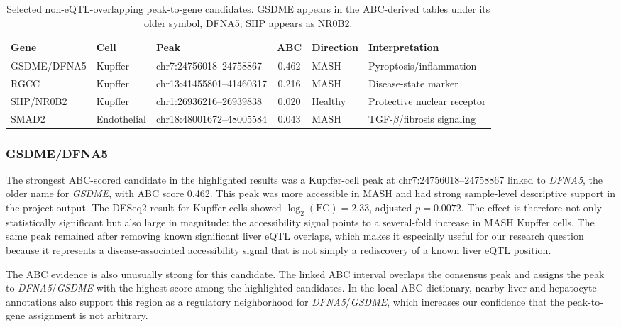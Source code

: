 \documentclass[11pt]{article}
\begin{document}
  \begin{table}[H]
    \centering
    \scriptsize
    \begin{tabularx}{\linewidth}{l l X c l X}
      \toprule
      Gene & Cell & Peak & ABC & Direction & Interpretation \\
      \midrule
      GSDME/DFNA5 & Kupffer & chr7:24756018--24758867 & 0.462 & MASH & Pyroptosis/inflammation \\
      RGCC & Kupffer & chr13:41455801--41460317 & 0.216 & MASH & Disease-state marker \\
      SHP/NR0B2 & Kupffer & chr1:26936216--26939838 & 0.020 & Healthy & Protective nuclear receptor \\
      SMAD2 & Endothelial & chr18:48001672--48005584 & 0.043 & MASH & TGF-\(\beta\)/fibrosis signaling \\
      \bottomrule
    \end{tabularx}
    \caption{Selected non-eQTL-overlapping peak-to-gene candidates. GSDME appears in the ABC-derived tables under its older symbol, DFNA5; SHP appears as NR0B2.}
    \label{tab:candidates}
  \end{table}

  \subsubsection{GSDME/DFNA5}
  The strongest ABC-scored candidate in the highlighted results was a Kupffer-cell peak at chr7:24756018--24758867 linked to \textit{DFNA5}, the older name for \textit{GSDME}, with ABC score 0.462.
  This peak was more accessible in MASH and had strong sample-level descriptive support in the project output.
  The DESeq2 result for Kupffer cells showed $\log_2(\mathrm{FC}) = 2.33$, adjusted $p = 0.0072$.
  The effect is therefore not only statistically significant but also large in magnitude: the accessibility signal points to a several-fold increase in MASH Kupffer cells.
  The same peak remained after removing known significant liver eQTL overlaps, which makes it especially useful for our research question because it represents a disease-associated accessibility signal that is not simply a rediscovery of a known liver eQTL position.

  The ABC evidence is also unusually strong for this candidate.
  The linked ABC interval overlaps the consensus peak and assigns the peak to \textit{DFNA5}/\textit{GSDME} with the highest score among the highlighted candidates.
  In the local ABC dictionary, nearby liver and hepatocyte annotations also support this region as a regulatory neighborhood for \textit{DFNA5}/\textit{GSDME}, which increases our confidence that the peak-to-gene assignment is not arbitrary.
\end{document}
